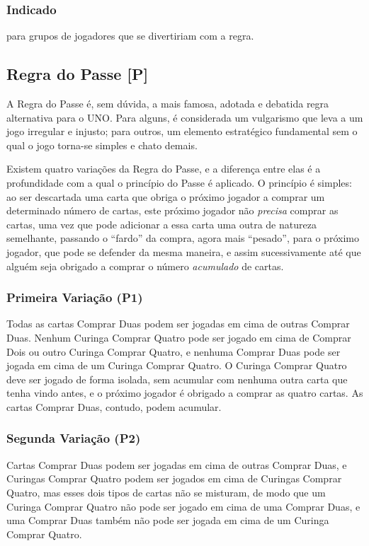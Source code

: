 \subsubsection{Indicado} 

para grupos de jogadores que se divertiriam com a regra.

\subsection{Regra do Passe [P]}

\label{regradopasse}

A Regra do Passe é, sem dúvida, a mais famosa, adotada e debatida regra alternativa para o UNO. Para alguns, é considerada um vulgarismo que leva a um jogo irregular e injusto; para outros, um elemento estratégico fundamental sem o qual o jogo torna-se simples e chato demais.

Existem quatro variações da Regra do Passe, e a diferença entre elas é a profundidade com a qual o princípio do Passe é aplicado. O princípio é simples: ao ser descartada uma carta que obriga o próximo jogador a comprar um determinado número de cartas, este próximo jogador não \emph{precisa} comprar as cartas, uma vez que pode adicionar a essa carta uma outra de natureza semelhante, passando o ``fardo'' da compra, agora mais ``pesado'', para o próximo jogador, que pode se defender da mesma maneira, e assim sucessivamente até que alguém seja obrigado a comprar o número \emph{acumulado} de cartas.

\subsubsection{Primeira Variação (P1)} Todas as cartas Comprar Duas podem ser jogadas em cima de outras Comprar Duas. Nenhum Curinga Comprar Quatro pode ser jogado em cima de Comprar Dois ou outro Curinga Comprar Quatro, e nenhuma Comprar Duas pode ser jogada em cima de um Curinga Comprar Quatro. O Curinga Comprar Quatro deve ser jogado de forma isolada, sem acumular com nenhuma outra carta que tenha vindo antes, e o próximo jogador é obrigado a comprar as quatro cartas. As cartas Comprar Duas, contudo, podem acumular.

\subsubsection{Segunda Variação (P2)} Cartas Comprar Duas podem ser jogadas em cima de outras Comprar Duas, e Curingas Comprar Quatro podem ser jogados em cima de Curingas Comprar Quatro, mas esses dois tipos de cartas não se misturam, de modo que um Curinga Comprar Quatro não pode ser jogado em cima de uma Comprar Duas, e uma Comprar Duas também não pode ser jogada em cima de um Curinga Comprar Quatro.

